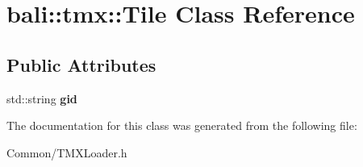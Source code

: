 \hypertarget{classbali_1_1tmx_1_1_tile}{\section{bali\-:\-:tmx\-:\-:Tile Class Reference}
\label{classbali_1_1tmx_1_1_tile}
}
\subsection*{Public Attributes}
\begin{DoxyCompactItemize}
\item 
\hypertarget{classbali_1_1tmx_1_1_tile_a4c392e24cc03efdc03c6d9faa760a7e5}{std\-::string {\bfseries gid}}\label{classbali_1_1tmx_1_1_tile_a4c392e24cc03efdc03c6d9faa760a7e5}

\end{DoxyCompactItemize}


The documentation for this class was generated from the following file\-:\begin{DoxyCompactItemize}
\item 
Common/T\-M\-X\-Loader.\-h\end{DoxyCompactItemize}

